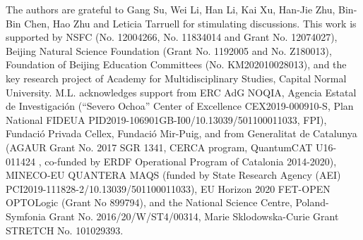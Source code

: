 \documentclass[aps,prl,twocolumn,superscriptaddress,a4paper,english,longbibliography]{revtex4-1}
\begin{document}
	


\begin{acknowledgments}
	The authors are grateful to Gang Su, Wei Li, Han Li, Kai Xu, Han-Jie Zhu, Bin-Bin Chen, Hao Zhu and Leticia Tarruell for stimulating discussions. This work is supported by NSFC (No. 12004266, No. 11834014 and Grant No. 12074027), Beijing Natural Science Foundation (Grant No. 1192005 and No. Z180013), Foundation of Beijing Education Committees (No. KM202010028013), and the key research project of Academy for Multidisciplinary Studies, Capital Normal University. M.L. acknowledges support from ERC AdG NOQIA, Agencia Estatal de Investigación (“Severo Ochoa” Center of Excellence CEX2019-000910-S, Plan National FIDEUA PID2019-106901GB-I00/10.13039/501100011033, FPI), Fundació Privada Cellex, Fundació Mir-Puig, and from Generalitat de Catalunya (AGAUR Grant No. 2017 SGR 1341, CERCA program, QuantumCAT U16-011424 , co-funded by ERDF Operational Program of Catalonia 2014-2020), MINECO-EU QUANTERA MAQS (funded by State Research Agency (AEI) PCI2019-111828-2/10.13039/501100011033), EU Horizon 2020 FET-OPEN OPTOLogic (Grant No 899794), and the National Science Centre, Poland-Symfonia Grant No. 2016/20/W/ST4/00314, Marie Sklodowska-Curie Grant STRETCH No. 101029393.
\end{acknowledgments}









\end{document}
